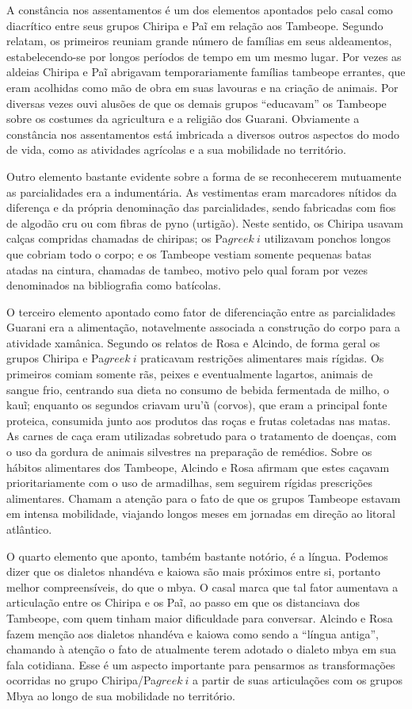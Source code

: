 {{A constância nos assentamentos é um dos elementos apontados pelo casal
como diacrítico entre seus grupos Chiripa e Paĩ
em relação aos Tambeope. Segundo relatam, os primeiros reuniam grande
número de famílias em seus aldeamentos, estabelecendo-se por longos
períodos de tempo em um mesmo lugar. Por vezes as aldeias Chiripa e
Paĩ abrigavam temporariamente famílias tambeope
errantes, que eram acolhidas como mão de obra em suas lavouras e na
criação de animais. Por diversas vezes ouvi alusões de que os demais
grupos ``educavam'' os Tambeope sobre os costumes da agricultura e a
religião dos Guarani. Obviamente a constância nos assentamentos está
imbricada a diversos outros aspectos do modo de vida, como as
atividades agrícolas e a sua mobilidade no território.

Outro elemento bastante evidente sobre a forma de se reconhecerem
mutuamente as parcialidades era a indumentária. As vestimentas eram
marcadores nítidos da diferença e da própria denominação das
parcialidades, sendo fabricadas com fios de algodão cru ou com fibras
de pyno (urtigão). Neste sentido, os Chiripa usavam calças compridas
chamadas de chiripas; os Pa${greek{~i}}$ utilizavam ponchos
longos que cobriam todo o corpo; e os Tambeope vestiam somente pequenas
batas atadas na cintura, chamadas de tambeo, motivo pelo qual foram por
vezes denominados na bibliografia como batícolas.

O terceiro elemento apontado como fator de diferenciação entre as
parcialidades Guarani era a alimentação, notavelmente associada a
construção do corpo para a atividade xamânica. Segundo os relatos de
Rosa e Alcindo, de forma geral os grupos Chiripa e
Pa${greek{~i}}$ praticavam restrições alimentares mais
rígidas. Os primeiros comiam somente rãs, peixes e eventualmente
lagartos, animais de sangue frio, centrando sua dieta no consumo de
bebida fermentada de milho, o kauĩ; enquanto os
segundos criavam uru’ũ (corvos), que eram a principal fonte proteica,
consumida junto aos produtos das roças e frutas coletadas nas matas. As
carnes de caça eram utilizadas sobretudo para o tratamento de doenças,
com o uso da gordura de animais silvestres na preparação de remédios.
Sobre os hábitos alimentares dos Tambeope, Alcindo e Rosa afirmam que
estes caçavam prioritariamente com o uso de armadilhas, sem seguirem
rígidas prescrições alimentares. Chamam a atenção para o fato de que os
grupos Tambeope estavam em intensa mobilidade, viajando longos meses em
jornadas em direção ao litoral atlântico. 

O quarto elemento que aponto, também bastante notório, é a língua.
Podemos dizer que os dialetos nhandéva e kaiowa são mais próximos entre
si, portanto melhor compreensíveis, do que o mbya. O casal marca que
tal fator aumentava a articulação entre os Chiripa e os
Paĩ, ao passo em que os distanciava dos Tambeope,
com quem tinham maior dificuldade para conversar. Alcindo e Rosa fazem
menção aos dialetos nhandéva e kaiowa como sendo a ``língua antiga'',
chamando à atenção o fato de atualmente terem adotado o dialeto mbya em
sua fala cotidiana. Esse é um aspecto importante para pensarmos as
transformações ocorridas no grupo Chiripa/Pa${greek{~i}}$ a
partir de suas articulações com os grupos Mbya ao longo de sua
mobilidade no território.

}}
